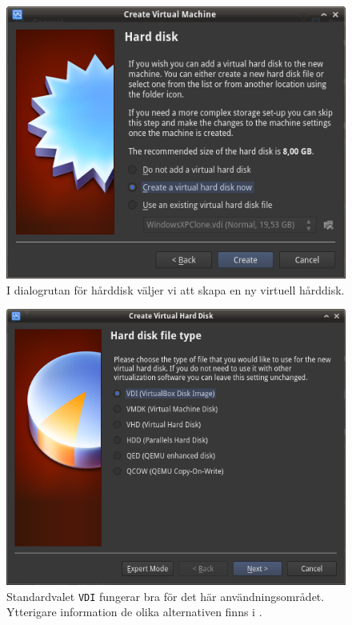 \begin{figure}[htbp]
  \centering
  \includegraphics[width=\linewidth]{img/A_new-04}
  \caption{I dialogrutan för hårddisk väljer vi att skapa en ny virtuell
           hårddisk.}
  \label{}
\end{figure}

\begin{figure}[htbp]
  \centering
  \includegraphics[width=\linewidth]{img/A_new-05}
  \caption{Standardvalet \texttt{VDI} fungerar bra för det här
           användningsområdet. Ytterigare information de olika alternativen
           finns i \cite{virtualbox:vdidetails}.}
  \label{}
\end{figure}


